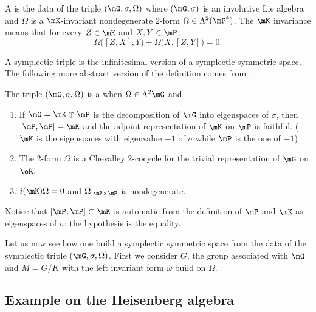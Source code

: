 A  is the data of the triple $(\mG,\sigma,\Omega)$ where $(\mG,\sigma)$ is an involutive Lie algebra and $\Omega$ is a $\mK$-invariant nondegenerate $2$-form $\Omega\in\Lambda^2(\mP^*)$. The $\mK$ invariance means that for every $Z\in\mK$ and $X,Y\in\mP$,
\begin{equation}
	\Omega\big( [Z,X],Y \big)+\Omega\big( X,[Z,Y] \big)=0.
\end{equation}

A symplectic triple is the infinitesimal version of a symplectic symmetric space. The following more abstract version of the definition comes from \cite{StrictSolvableSym}:
\begin{definition}
	The triple $(\mG,\sigma,\Omega)$ is a  when $\Omega\in\Lambda^2\mG$ and
	\begin{enumerate}
		\item  If  $\mG=\mK\oplus\mP$ is the decomposition of $\mG$ into eigenspaces of $\sigma$,  then $[\mP,\mP]=\mK$ and the adjoint representation of $\mK$ on $\mP$ is faithful. ($\mK$ is the eigenspaces with eigenvalue $+1$ of $\sigma$ while $\mP$ is the one of $-1$)
   
		\item The $2$-form $\Omega$ is a Chevalley $2$-cocycle for the trivial representation of $\mG$ on $\eR$.
	  
		\item $i(\mK)\Omega=0$ and $\Omega|_{\mP\times\mP}$ is nondegenerate.
	\end{enumerate}
\end{definition}

Notice that $[\mP,\mP]\subset\mK$ is automatic from the definition of $\mP$ and $\mK$ as eigenspaces of $\sigma$; the hypothesis is the equality.

Let us now see how one build a symplectic symmetric space from the data of the symplectic triple $(\mG,\sigma,\Omega)$. First we consider $G$, the group associated with $\mG$ and $M=G/K$ with the left invariant form $\omega$ build on $\Omega$.

\subsection{Example on the Heisenberg algebra}

